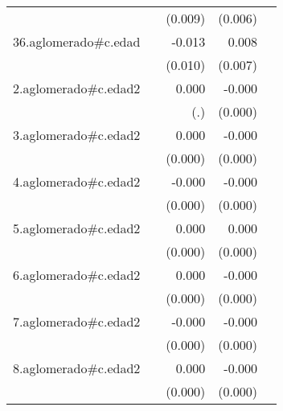 {\begin{longtable}{l*{4}{D{.}{.}{-1}}}
            &                     &     (0.009)         &     (0.006)         &                     \\
\addlinespace
36.aglomerado#c.edad&                     &      -0.013         &       0.008         &                     \\
            &                     &     (0.010)         &     (0.007)         &                     \\
\addlinespace
2.aglomerado#c.edad2&                     &       0.000         &      -0.000\sym{**} &                     \\
            &                     &         (.)         &     (0.000)         &                     \\
\addlinespace
3.aglomerado#c.edad2&                     &       0.000         &      -0.000\sym{***}&                     \\
            &                     &     (0.000)         &     (0.000)         &                     \\
\addlinespace
4.aglomerado#c.edad2&                     &      -0.000         &      -0.000\sym{***}&                     \\
            &                     &     (0.000)         &     (0.000)         &                     \\
\addlinespace
5.aglomerado#c.edad2&                     &       0.000         &       0.000         &                     \\
            &                     &     (0.000)         &     (0.000)         &                     \\
\addlinespace
6.aglomerado#c.edad2&                     &       0.000         &      -0.000         &                     \\
            &                     &     (0.000)         &     (0.000)         &                     \\
\addlinespace
7.aglomerado#c.edad2&                     &      -0.000         &      -0.000\sym{*}  &                     \\
            &                     &     (0.000)         &     (0.000)         &                     \\
\addlinespace
8.aglomerado#c.edad2&                     &       0.000         &      -0.000         &                     \\
            &                     &     (0.000)         &     (0.000)         &                     \\

\end{longtable}}
